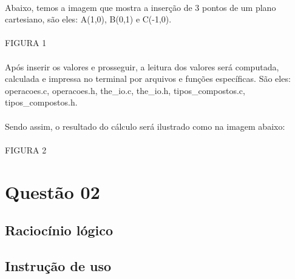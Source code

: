 \documentclass[11pt]{article}
\begin{document}
        \paragraph{}	Abaixo, temos a imagem que mostra a inser\c{c}\~ao de 3 pontos de um plano cartesiano, s\~ao eles: A(1,0), B(0,1) e C(-1,0). 
        \paragraph{}	FIGURA 1
        \paragraph{}	Ap\'os inserir os valores e prosseguir, a leitura dos valores ser\'a computada, calculada e impressa no terminal por arquivos e fun\c{c}\~oes espec\'ificas. S\~ao eles: operacoes.c, operacoes.h, the\_io.c, the\_io.h, tipos\_compostos.c, tipos\_compostos.h. 
        \paragraph{}	Sendo assim, o resultado do c\'alculo ser\'a ilustrado como na imagem abaixo:
         \paragraph{}	FIGURA 2
\section{Quest\~ao 02}
	\subsection{Racioc\'inio l\'ogico}
	\subsection{Instru\c{c}\~ao de uso}
\end{document}

